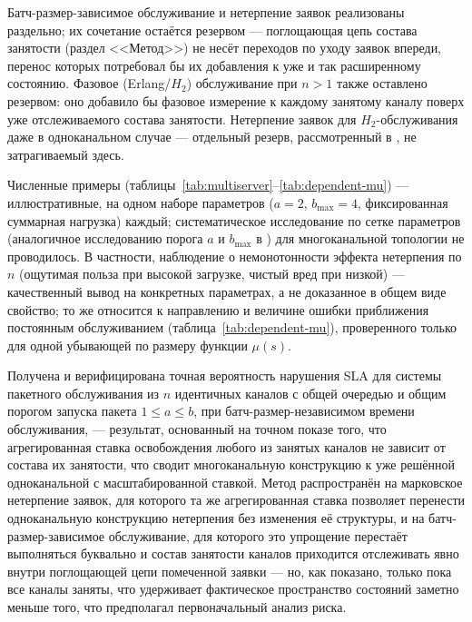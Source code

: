 \documentclass[12pt,a4paper]{article}
\newcommand{\articlesection}[1]{\par\vspace{14pt}{\bfseries #1}\par\vspace{6pt}\nopagebreak}
\begin{document}
\articlesection{Ограничения}

Батч-размер-зависимое обслуживание и нетерпение заявок реализованы раздельно; их сочетание остаётся резервом --- поглощающая цепь состава занятости (раздел <<Метод>>) не несёт переходов по уходу заявок впереди, перенос которых потребовал бы их добавления к уже и так расширенному состоянию. Фазовое (Erlang/$H_2$) обслуживание при $n>1$ также оставлено резервом: оно добавило бы фазовое измерение к каждому занятому каналу поверх уже отслеживаемого состава занятости. Нетерпение заявок для $H_2$-обслуживания даже в одноканальном случае --- отдельный резерв, рассмотренный в \cite{khabarovsingle2026}, не затрагиваемый здесь.

Численные примеры (таблицы~\ref{tab:multiserver}--\ref{tab:dependent-mu}) --- иллюстративные, на одном наборе параметров ($a=2$, $b_{\max}=4$, фиксированная суммарная нагрузка) каждый; систематическое исследование по сетке параметров (аналогичное исследованию порога $a$ и $b_{\max}$ в \cite{khabarovsingle2026}) для многоканальной топологии не проводилось. В частности, наблюдение о немонотонности эффекта нетерпения по $n$ (ощутимая польза при высокой загрузке, чистый вред при низкой) --- качественный вывод на конкретных параметрах, а не доказанное в общем виде свойство; то же относится к направлению и величине ошибки приближения постоянным обслуживанием (таблица~\ref{tab:dependent-mu}), проверенного только для одной убывающей по размеру функции $\mu(s)$.

\articlesection{Заключение}

Получена и верифицирована точная вероятность нарушения SLA для системы пакетного обслуживания из $n$ идентичных каналов с общей очередью и общим порогом запуска пакета $1\le a\le b$, при батч-размер-независимом времени обслуживания, --- результат, основанный на точном показе того, что агрегированная ставка освобождения любого из занятых каналов не зависит от состава их занятости, что сводит многоканальную конструкцию к уже решённой одноканальной \cite{khabarovsingle2026} с масштабированной ставкой. Метод распространён на марковское нетерпение заявок, для которого та же агрегированная ставка позволяет перенести одноканальную конструкцию нетерпения без изменения её структуры, и на батч-размер-зависимое обслуживание, для которого это упрощение перестаёт выполняться буквально и состав занятости каналов приходится отслеживать явно внутри поглощающей цепи помеченной заявки --- но, как показано, только пока все каналы заняты, что удерживает фактическое пространство состояний заметно меньше того, что предполагал первоначальный анализ риска.
\end{document}
